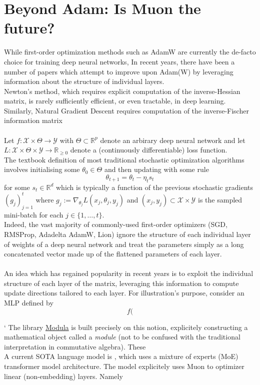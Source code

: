 \documentclass[12pt]{book}
\newcommand{\R}{\mathbb{R}}
\begin{document}
\chapter{Beyond Adam: Is Muon the future?}
While first-order optimization methods such as AdamW are currently the de-facto choice for training deep neural networks, 
In recent years, there have been a number of papers which attempt to improve upon Adam(W) by leveraging information about the structure of individual layers. \\
Newton's method, which requires explicit computation of the inverse-Hessian matrix, is rarely sufficiently efficient, or even tractable, in deep learning. Similarly, Natural Gradient Descent \cite{NGdescent} requires computation of the inverse-Fischer information matrix \\
\\
Let $f:\mathcal{X} \times \Theta \to \mathcal{Y}$ with $\Theta \subset \R^{p}$ denote an arbirary deep neural network and let $L:  \mathcal{X} \times \Theta \times \mathcal{Y} \to \R_{\ge0}$ denote a (continuously differentiable) loss function. \\
The textbook definition of most traditional stochastic optimization algorithms involves initialising some $\theta_0 \in \Theta$ and then updating with some rule 
\[
\theta_{t+1} = \theta_t - \eta_t s_t 
\] 
for some $s_t \in \R^{d}$ which is typically a function of the previous stochastic gradients $(g_{j})_{j=1}^t $ where $g_j := \nabla _{\theta_j} L(x_j, \theta_j, y_j)$ and $(x_j, y_j)\subset \mathcal{X}\times\mathcal{Y}$ is the sampled mini-batch for each $j\in\{1,\ldots,t\} $.  \\
Indeed, the vast majority of commonly-used first-order optimizers (SGD, RMSProp, Adadelta AdamW, Lion) ignore the structure of each individual layer of weights of a deep neural network and treat the parameters simply as a long concatenated vector made up of the flattened parameters of each layer.  \\
\\
An idea which has regained popularity in recent years is to exploit the individual structure of each layer of the matrix, leveraging this information to compute update directions tailored to each layer. For illustration's purpose, consider an MLP defined by 
\[
f(
\] 

 `
The library \href{https://github.com/modula-systems/modula}{Modula} is built precisely on this notion, explicitely constructing a mathematical object called a \textit{module} (not to be confused with the traditional interpretation in commutative algebra). These 
\\
A current SOTA language model is \cite{moonshot}, which uses a  mixture of experts (MoE) transformer model architecture. The model explicitely uses Muon to optimizer linear (non-embedding) layers. Namely
\\
\end{document}
